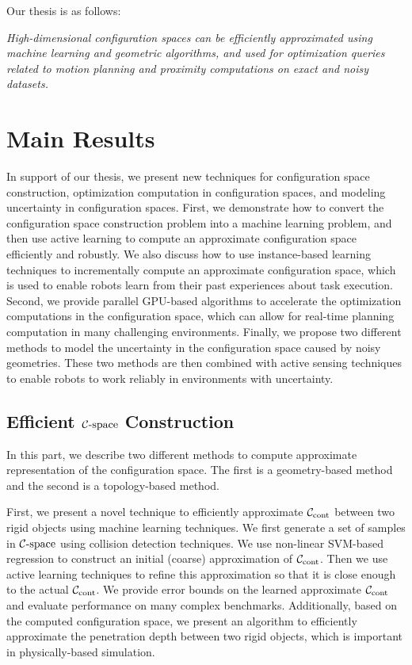 Our thesis is as follows:

\textit{High-dimensional configuration spaces can be efficiently approximated using machine learning and geometric algorithms, and used for optimization queries related to motion planning and proximity computations on exact and noisy datasets.}

\section{Main Results}
In support of our thesis, we present new techniques for configuration space construction, optimization computation in configuration spaces, and modeling uncertainty in configuration spaces. First, we demonstrate how to convert the configuration space construction problem into a machine learning problem, and then use active learning to compute an approximate configuration space efficiently and robustly. We also discuss how to use instance-based learning techniques to incrementally compute an approximate configuration space, which is used to enable robots learn from their past experiences about task execution. Second, we provide parallel GPU-based algorithms to accelerate the optimization computations in the configuration space, which can allow for real-time planning computation in many challenging environments. Finally, we propose two different methods to model the uncertainty in the configuration space caused by noisy geometries. These two methods are then combined with active sensing techniques to enable robots to work reliably in environments with uncertainty.

\subsection{Efficient $\mathcal C\text{-space}$ Construction}
In this part, we describe two different methods to compute approximate representation of the configuration space. The first is a geometry-based method and the second is a topology-based method.

First, we present a novel technique to efficiently approximate $\mathcal C_\text{cont}$ between two rigid objects using machine learning techniques. We first generate a set of samples in $\mathcal C\text{-space}$ using collision detection techniques. We use non-linear SVM-based regression to construct an initial (coarse) approximation of $\mathcal C_\text{cont}$. Then we use active learning techniques to refine this approximation so that it is close enough to the actual $\mathcal C_\text{cont}$. We provide error bounds on the learned approximate $\mathcal C_\text{cont}$ and evaluate performance on many complex benchmarks. Additionally, based on the computed configuration space, we present an algorithm to efficiently approximate the penetration depth between two rigid objects, which is important in physically-based simulation.

